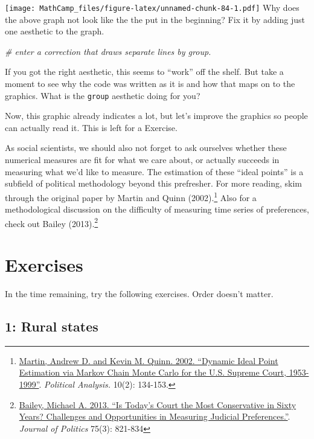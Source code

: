 \documentclass[
]{book}
\newenvironment{Shaded}{\begin{snugshade}}{\end{snugshade}}
\newcommand{\CommentTok}[1]{\textcolor[rgb]{0.56,0.35,0.01}{\textit{#1}}}
\theoremstyle{definition}
\theoremstyle{definition}
\theoremstyle{definition}
\theoremstyle{definition}
\theoremstyle{remark}
\begin{document}
\texttt{[image: MathCamp\_files/figure-latex/unnamed-chunk-84-1.pdf]}
Why does the above graph not look like the the put in the beginning? Fix it by adding just one aesthetic to the graph.

\begin{Shaded}
\begin{Highlighting}[]
\CommentTok{# enter a correction that draws separate lines by group.}
\end{Highlighting}
\end{Shaded}

If you got the right aesthetic, this seems to ``work'' off the shelf. But take a moment to see why the code was written as it is and how that maps on to the graphics. What is the \texttt{group} aesthetic doing for you?

Now, this graphic already indicates a lot, but let's improve the graphics so people can actually read it. This is left for a Exercise.

As social scientists, we should also not forget to ask ourselves whether these numerical measures are fit for what we care about, or actually succeeds in measuring what we'd like to measure. The estimation of these ``ideal points'' is a subfield of political methodology beyond this prefresher. For more reading, skim through the original paper by Martin and Quinn (2002).\footnote{\href{http://mqscores.lsa.umich.edu/media/pa02.pdf}{Martin, Andrew D. and Kevin M. Quinn. 2002. ``Dynamic Ideal Point Estimation via Markov Chain Monte Carlo for the U.S. Supreme Court, 1953-1999''}. \emph{Political Analysis.} 10(2): 134-153.} Also for a methodological discussion on the difficulty of measuring time series of preferences, check out Bailey (2013).\footnote{\href{https://michaelbailey.georgetown.domains/wp-content/uploads/2018/05/JOP_proofs_June2013.pdf}{Bailey, Michael A. 2013. ``Is Today's Court the Most Conservative in Sixty Years? Challenges and Opportunities in Measuring Judicial Preferences.''}. \emph{Journal of Politics} 75(3): 821-834}

\hypertarget{exercises-1}{%
\section*{Exercises}\label{exercises-1}}

In the time remaining, try the following exercises. Order doesn't matter.

\hypertarget{rural-states}{%
\subsection*{1: Rural states}\label{rural-states}}
\end{document}
